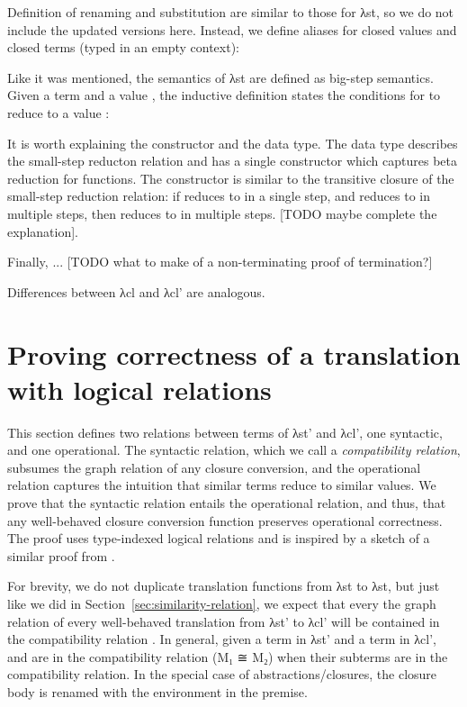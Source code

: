 \documentclass[bsc,frontabs,oneside,singlespacing,parskip,deptreport]{infthesis}
\theoremstyle{definition}
\begin{document}
Definition of renaming and substitution are similar to those for
λst, so we do not include the updated versions here. Instead, we define
aliases for closed values  and closed terms  (typed
in an empty context):


Like it was mentioned, the semantics of λst are defined as big-step
semantics. Given a term  and a value , the inductive
definition  states the conditions for  to reduce to a
value :


It is worth explaining the  constructor and the 
data type. The  data type describes the small-step
reducton relation and has a single constructor which captures beta
reduction for functions. The  constructor is similar to the
transitive closure of the small-step reduction relation: if 
reduces to  in a single step, and  reduces to  in
multiple steps, then  reduces to  in multiple steps. [TODO
maybe complete the explanation].

Finally, ... [TODO what to make of a non-terminating proof of
termination?]


Differences between λcl and λcl' are analogous.

\section{Proving correctness of a translation with logical relations}
\label{sec:logical-relations}

This section defines two relations between terms of λst' and λcl', one
syntactic, and one operational. The syntactic relation, which we call
a \textit{compatibility relation}, subsumes the graph relation of any
closure conversion, and the operational relation captures the
intuition that similar terms reduce to similar values. We prove that
the syntactic relation entails the operational relation, and thus,
that any well-behaved closure conversion function preserves
operational correctness. The proof uses type-indexed logical relations
and is inspired by a sketch of a similar proof from
\cite{DBLP:conf/popl/MinamideMH96}.

For brevity, we do not duplicate translation functions from λst to
λst, but just like we did in Section~\ref{sec:similarity-relation}, we
expect that every the graph relation of every well-behaved translation
from λst' to λcl' will be contained in the compatibility relation
. In general, given a term  in λst' and a term  in
λcl',  and  are in the compatibility relation (M₁ ≅ M₂)
when their subterms are in the compatibility relation. In the special
case of abstractions/closures, the closure body is renamed with the
environment in the premise.
\end{document}
